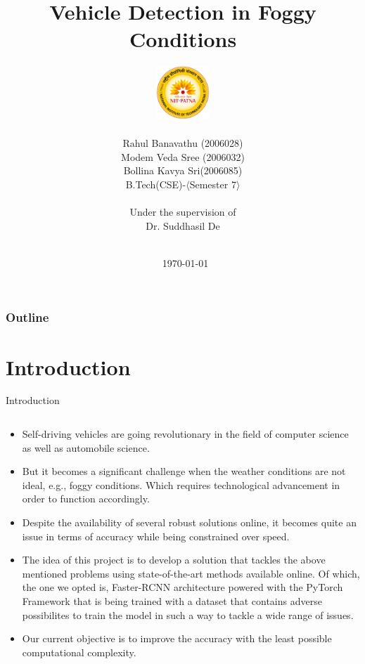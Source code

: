 \documentclass[10pt,aspectratio=169,t]{beamer}
\title[Improved Foggy Object Detection]{\LARGE Vehicle Detection in Foggy Conditions}
\author[]{{\includegraphics[height=2cm]{nitlogo.png}\\[-0.5cm]\large \\Rahul Banavathu (2006028) \\Modem Veda Sree (2006032) \\Bollina Kavya Sri(2006085)}\\[0.15cm]B.Tech(CSE)-$\langle$Semester 7$\rangle$\\ \hspace{0.35cm} \\ Under the supervision of\\Dr. Suddhasil De\\ \\}
\institute[CSE Dept., NIT Patna]{Department of Computer Science and Engineering\\National Institute of Technology Patna\\[-0.4cm]}
\date[]{\scriptsize ~\today\\[-0.5cm]}
\begin{document}
\begin{frame}
\maketitle
\end{frame}

\begin{frame}
\frametitle{Outline}
\tableofcontents
\end{frame}

\newpage

\section{Introduction}
\begin{frame}[allowframebreaks]{Introduction}

\begin{columns}
\begin{column}{1\textwidth}
\vspace{-0.5cm}
\begin{itemize}
 \justifying
\item Self-driving vehicles are going revolutionary in the field of computer science as well as automobile science.

\item But it becomes a significant challenge when the weather conditions are not ideal, e.g., foggy conditions. Which requires technological advancement in order to function accordingly.
\item Despite the availability of several robust solutions online, it becomes quite an issue in terms of accuracy while being constrained over speed. 
\item The idea of this project is to develop a solution that tackles the above mentioned problems using state-of-the-art methods available online. Of which, the one we opted is, Faster-RCNN architecture powered with the PyTorch Framework that is being trained with a dataset that contains adverse possibilites to train the model in such a way to tackle a wide range of issues.
\item Our current objective is to improve the accuracy with the least possible computational complexity.
\end{itemize}
\end{column}
\end{columns}
\end{frame}
\end{document}
